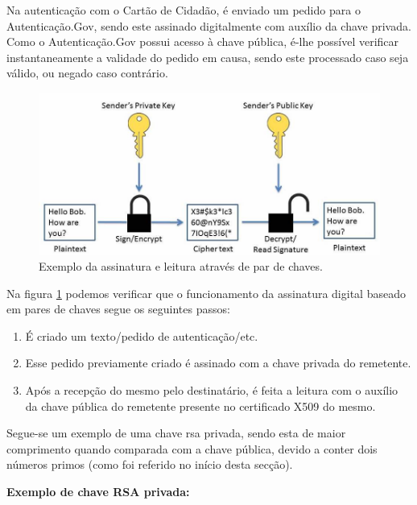 Na autenticação com o Cartão de Cidadão, é enviado um pedido para o Autenticação.Gov, sendo este assinado digitalmente com auxílio da chave privada. 
Como o Autenticação.Gov possui acesso à chave pública, é-lhe possível verificar instantaneamente a validade do pedido em causa, sendo este processado caso seja válido, ou negado caso contrário.

\begin{figure}[h]
    \centering
    \includegraphics[width=\textwidth]{img/cc/OpenPGPSign.jpg}
    \caption{Exemplo da assinatura e leitura através de par de chaves.}
    \label{fig:par_chaves}
\end{figure}

Na figura \ref{fig:par_chaves} podemos verificar que o funcionamento da assinatura digital baseado em pares de chaves segue os seguintes passos:

\begin{enumerate}
    \item É criado um texto/pedido de autenticação/etc.
    \item Esse pedido previamente criado é assinado com a chave privada do remetente.
    \item Após a recepção do mesmo pelo destinatário, é feita a leitura com o auxílio da chave pública do remetente presente no certificado X509 do mesmo.
\end{enumerate}

Segue-se um exemplo de uma chave \gls{rsa} privada, sendo esta de maior comprimento quando comparada com a chave pública, devido a conter dois números primos (como foi referido no início desta secção).

\vspace{5mm}
\textbf{Exemplo de chave RSA privada:}

